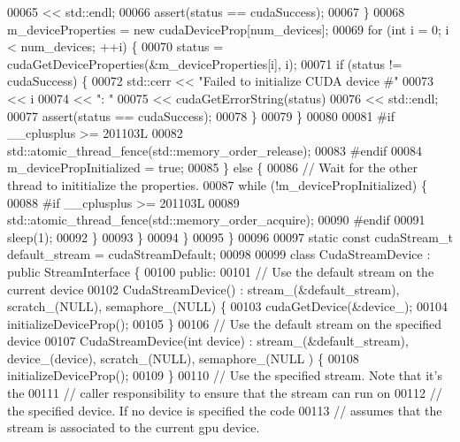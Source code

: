 \begin{DoxyCode}
00065                   << std::endl;
00066         assert(status == cudaSuccess);
00067       \}
00068       m\_deviceProperties = \textcolor{keyword}{new} cudaDeviceProp[num\_devices];
00069       \textcolor{keywordflow}{for} (\textcolor{keywordtype}{int} i = 0; i < num\_devices; ++i) \{
00070         status = cudaGetDeviceProperties(&m\_deviceProperties[i], i);
00071         \textcolor{keywordflow}{if} (status != cudaSuccess) \{
00072           std::cerr << \textcolor{stringliteral}{"Failed to initialize CUDA device #"}
00073                     << i
00074                     << \textcolor{stringliteral}{": "}
00075                     << cudaGetErrorString(status)
00076                     << std::endl;
00077           assert(status == cudaSuccess);
00078         \}
00079       \}
00080 
00081 \textcolor{preprocessor}{#if \_\_cplusplus >= 201103L}
00082       std::atomic\_thread\_fence(std::memory\_order\_release);
00083 \textcolor{preprocessor}{#endif}
00084       m\_devicePropInitialized = \textcolor{keyword}{true};
00085     \} \textcolor{keywordflow}{else} \{
00086       \textcolor{comment}{// Wait for the other thread to inititialize the properties.}
00087       \textcolor{keywordflow}{while} (!m\_devicePropInitialized) \{
00088 \textcolor{preprocessor}{#if \_\_cplusplus >= 201103L}
00089         std::atomic\_thread\_fence(std::memory\_order\_acquire);
00090 \textcolor{preprocessor}{#endif}
00091         sleep(1);
00092       \}
00093     \}
00094   \}
00095 \}
00096 
00097 \textcolor{keyword}{static} \textcolor{keyword}{const} cudaStream\_t default\_stream = cudaStreamDefault;
00098 
00099 \textcolor{keyword}{class }CudaStreamDevice : \textcolor{keyword}{public} StreamInterface \{
00100  \textcolor{keyword}{public}:
00101   \textcolor{comment}{// Use the default stream on the current device}
00102   CudaStreamDevice() : stream\_(&default\_stream), scratch\_(NULL), semaphore\_(NULL) \{
00103     cudaGetDevice(&device\_);
00104     initializeDeviceProp();
00105   \}
00106   \textcolor{comment}{// Use the default stream on the specified device}
00107   CudaStreamDevice(\textcolor{keywordtype}{int} device) : stream\_(&default\_stream), device\_(device), scratch\_(NULL), semaphore\_(NULL
      ) \{
00108     initializeDeviceProp();
00109   \}
00110   \textcolor{comment}{// Use the specified stream. Note that it's the}
00111   \textcolor{comment}{// caller responsibility to ensure that the stream can run on}
00112   \textcolor{comment}{// the specified device. If no device is specified the code}
00113   \textcolor{comment}{// assumes that the stream is associated to the current gpu device.}

\end{DoxyCode}
